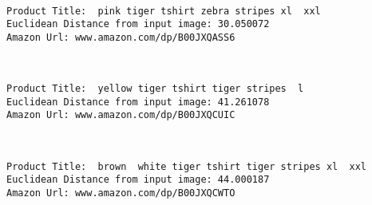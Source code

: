 \documentclass[11pt]{article}
\begin{document}
    \begin{center}
    \end{center}
    { \hspace*{\fill} \\}
    
    \begin{Verbatim}[commandchars=\\\{\}]
Product Title:  pink tiger tshirt zebra stripes xl  xxl 
Euclidean Distance from input image: 30.050072
Amazon Url: www.amazon.com/dp/B00JXQASS6

    \end{Verbatim}

    \begin{center}
    \end{center}
    { \hspace*{\fill} \\}
    
    \begin{Verbatim}[commandchars=\\\{\}]
Product Title:  yellow tiger tshirt tiger stripes  l 
Euclidean Distance from input image: 41.261078
Amazon Url: www.amazon.com/dp/B00JXQCUIC

    \end{Verbatim}

    \begin{center}
    \end{center}
    { \hspace*{\fill} \\}
    
    \begin{Verbatim}[commandchars=\\\{\}]
Product Title:  brown  white tiger tshirt tiger stripes xl  xxl 
Euclidean Distance from input image: 44.000187
Amazon Url: www.amazon.com/dp/B00JXQCWTO

    \end{Verbatim}

    \begin{center}
    \end{center}
    { \hspace*{\fill} \\}
    
\end{document}
